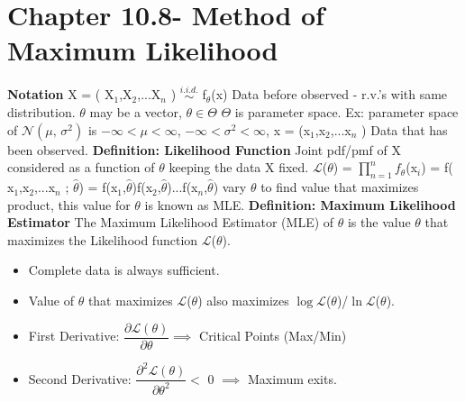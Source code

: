 \documentclass[]{article}
\begin{document}
\section{Chapter 10.8- Method of Maximum Likelihood}
\Large\textbf{Notation}
\newline X = ( X$_1$,X$_2$,...X$_n$ )  $\stackrel{i.i.d.}{\sim}$ f$_\theta$(x)  \newline Data before observed - r.v.'s with same distribution.
\newline
\newline $\theta$ may be a vector, $\theta \in \Theta$
\newline
\newline $\Theta$ is parameter space. 
\newline Ex: parameter space of $\mathcal{N}(\mu,\,\sigma^{2})$ is $-\infty < \mu < \infty$, $-\infty < \sigma^2 < \infty$,
\newline
\newline x = (x$_1$,x$_2$,...x$_n$ )   Data that has been observed.
\newline
\newline 
\Large\textbf{Definition: Likelihood Function}
\newline Joint pdf/pmf of X considered as a function of $\theta$ keeping the data X fixed.
\newline
\newline $\mathcal{L}$($\theta$) = $\displaystyle\prod_{n=1}^{n} f_\theta$(x$_i$)  =  f( x$_1$,x$_2$,...x$_n$ ; $\hat\theta$) = f(x$_1$,$\hat\theta$)f(x$_2$,$\hat\theta$)...f(x$_n$,$\hat\theta$)
\newline
\newline vary $\theta$ to find value that maximizes product, this value for $\theta$ is known as MLE.
\newline
\newline
\Large\textbf{Definition: Maximum Likelihood Estimator}
\newline The Maximum Likelihood Estimator (MLE) of $\theta$ is the value $\theta$ that maximizes the Likelihood function $\mathcal{L}$($\theta$).
\begin{itemize}
	\item Complete  data is always sufficient.
	\item Value of $\theta$ that maximizes $\mathcal{L}$($\theta$) also maximizes $\log\mathcal{L}$($\theta$)/$\ln\mathcal{L}$($\theta$). 	
	\item First Derivative: $\dfrac{\partial\mathcal{L}(\theta)  }{\partial\theta} \implies$ Critical Points (Max/Min)
	\item Second Derivative: $\dfrac{\partial^2\mathcal{L}(\theta)  }{\partial\theta^2} < $ 0 $\implies$  Maximum exits.\newline
\end{itemize}
\end{document}
